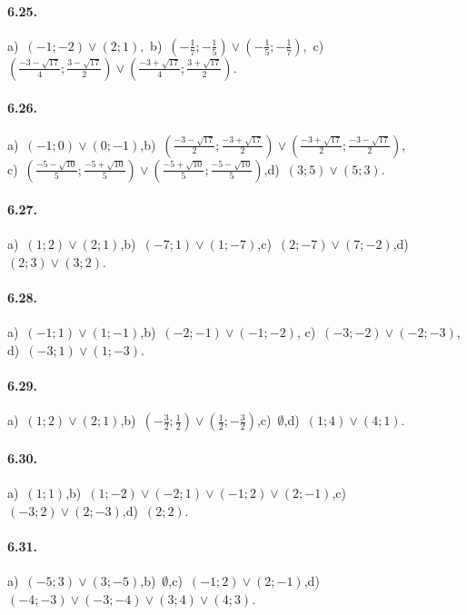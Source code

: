 \paragraph{6.25.} a)~$ (-1; -2)\vee(2;1) $,\, b)~$\left(-\frac 1 7;-\frac 1 5\right)\vee\left(-\frac 1 5;-\frac 1 7\right)$,\, c)~$\left(\frac{-3-\sqrt{17}} 4;{\frac{3-\sqrt{17}} 2}\right)\vee \left(\frac{-3+\sqrt{17}} 4;{\frac{3+\sqrt{17}} 2}\right)$.

\paragraph{6.26.} a)~$(-1;0)\vee(0;-1)$,\quad b)~$\left(\frac{-3-\sqrt{17}} 2;\frac{-3+\sqrt{17}} 2\right)\vee\left(\frac{-3+\sqrt{17}} 2;\frac{-3-\sqrt{17}} 2\right)$,\protect\\
\quad c)~$\left(\frac{-5-\sqrt{10}} 5;\frac{-5+\sqrt{10}} 5\right)\vee \left(\frac{-5+\sqrt{10}} 5;\frac{-5-\sqrt{10}} 5\right)$,\quad d)~$(3;5)\vee(5;3)$.

\paragraph{6.27.} a)~$(1;2)\vee(2;1)$,\quad b)~$(-7;1)\vee(1;-7)$,\quad c)~$(2;-7)\vee(7;-2)$,\quad d)~$(2;3)\vee(3;2)$.

\paragraph{6.28.} a)~$(-1;1)\vee(1;-1)$,\;b)~$(-2;-1)\vee(-1;-2)$,\; c)~$(-3;-2)\vee(-2;-3)$,\; d)~$(-3;1)\vee(1;-3)$.

\paragraph{6.29.} a)~$(1;2)\vee(2;1)$,\quad b)~$\left(-\frac 3 2;\frac 1 2\right)\vee\left(\frac 1 2;-\frac 3 2\right)$,\quad c)~$\emptyset$,\quad d)~$(1;4)\vee(4;1)$.

\paragraph{6.30.} a)~$(1;1)$,\quad b)~$(1;-2)\vee(-2;1)\vee(-1;2)\vee(2;-1)$,\quad c)~$(-3;2)\vee(2;-3)$,\quad d)~$(2;2)$.

\paragraph{6.31.} a)~$(-5;3)\vee(3;-5)$,\quad b)~$\emptyset$,\quad c)~$(-1;2)\vee(2;-1)$,\quad d)~$(-4;-3)\vee(-3;-4)\vee(3;4)\vee(4;3)$.

